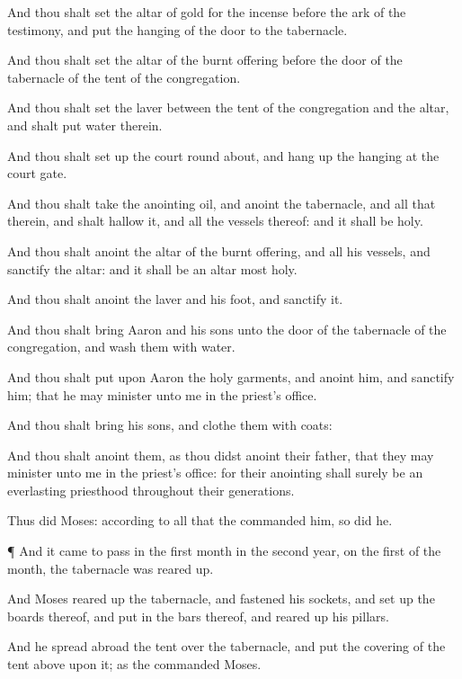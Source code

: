 {And thou shalt
set the
altar of
gold for the
incense
before the
ark of the
testimony, and
put the
hanging of the
door to the
tabernacle.

And thou shalt
set the
altar of the burnt
offering
before the
door of the
tabernacle of the
tent of the
congregation.

And thou shalt
set the
laver between the
tent of the
congregation and the
altar, and shalt
put
water therein.

And thou shalt set
up the
court round
about, and hang
up the
hanging at the
court
gate.

And thou shalt
take the
anointing
oil, and
anoint the
tabernacle, and all that
{} therein, and shalt
hallow it, and all the
vessels thereof: and it shall be
holy.

And thou shalt
anoint the
altar of the burnt
offering, and all his
vessels, and
sanctify the
altar: and it shall be an
altar
most
holy.

And thou shalt
anoint the
laver and his
foot, and
sanctify it.

And thou shalt
bring
Aaron and his
sons unto the
door of the
tabernacle of the
congregation, and
wash them with
water.

And thou shalt
put upon
Aaron the
holy
garments, and
anoint him, and
sanctify him; that he may minister unto me in the
priest’s office.

And thou shalt
bring his
sons, and
clothe them with
coats:

And thou shalt
anoint them, as thou didst
anoint their
father, that they may minister unto me in the
priest’s office: for their
anointing shall surely be an
everlasting
priesthood throughout their
generations.


\par }{\PP {}Thus
did
Moses: according to all that the
{}
commanded him, so
did he.


\par }{\PP {}¶ And it came to pass in the
first
month in the
second
year, on the
first
{} of the
month,
{} the
tabernacle was reared
up.

And
Moses reared
up the
tabernacle, and
fastened his
sockets, and set
up the
boards thereof, and
put in the
bars thereof, and reared
up his
pillars.

And he spread
abroad the
tent over the
tabernacle, and
put the
covering of the
tent
above upon it; as the
{}
commanded
Moses.


}

